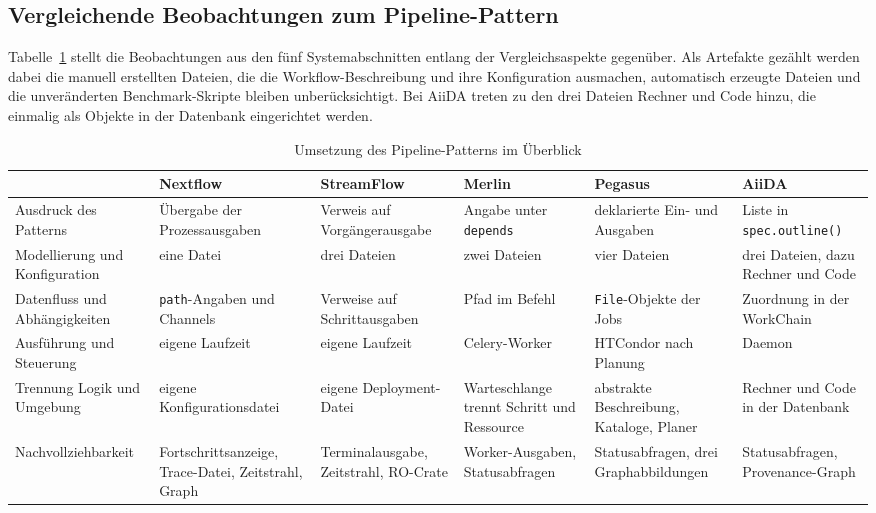 \subsection{Vergleichende Beobachtungen zum Pipeline-Pattern}
\label{sec:lokal:pipeline:zusammenfassung}

Tabelle~\ref{tab:pipe:vergleich} stellt die Beobachtungen aus den
fünf Systemabschnitten entlang der Vergleichsaspekte gegenüber. Als
Artefakte gezählt werden dabei die manuell erstellten Dateien, die
die Workflow-Beschreibung und ihre Konfiguration ausmachen,
automatisch erzeugte Dateien und die unveränderten Benchmark-Skripte
bleiben unberücksichtigt. Bei AiiDA treten zu den drei Dateien
Rechner und Code hinzu, die einmalig als Objekte in der Datenbank
eingerichtet werden.

\begin{table}[H]
  \caption{Umsetzung des Pipeline-Patterns im Überblick}
  \label{tab:pipe:vergleich}
  \centering
  \scriptsize
  \setlength{\tabcolsep}{3pt}
  \renewcommand{\arraystretch}{1.4}
  \begin{tabular}{>{\raggedright\arraybackslash}p{2.7cm} >{\raggedright\arraybackslash}p{1.9cm} >{\raggedright\arraybackslash}p{1.9cm} >{\raggedright\arraybackslash}p{1.9cm} >{\raggedright\arraybackslash}p{1.9cm} >{\raggedright\arraybackslash}p{1.9cm}}
    \hline
     & \textbf{Nextflow} & \textbf{Stream\-Flow} & \textbf{Merlin} & \textbf{Pegasus} & \textbf{AiiDA} \\
    \hline
    Ausdruck des Patterns & Übergabe der Prozess\-ausgaben & Verweis auf Vorgänger\-ausgabe & Angabe unter \texttt{depends} & deklarierte Ein- und Ausgaben & Liste in \texttt{spec.outline()} \\
    Modellierung und Konfiguration & eine Datei & drei Dateien & zwei Dateien & vier Dateien & drei Dateien, dazu Rechner und Code \\
    Datenfluss und Abhängigkeiten & \texttt{path}-Angaben und Channels & Verweise auf Schritt\-ausgaben & Pfad im Befehl & \texttt{File}-Objekte der Jobs & Zuordnung in der WorkChain \\
    Ausführung und Steuerung & eigene Laufzeit & eigene Laufzeit & Celery-Worker & HTCondor nach Planung & Daemon \\
    Trennung Logik und Umgebung & eigene Konfigu\-rationsdatei & eigene Deployment-Datei & Warteschlange trennt Schritt und Ressource & abstrakte Beschreibung, Kataloge, Planer & Rechner und Code in der Datenbank \\
    Nachvollziehbarkeit & Fortschritts\-anzeige, Trace-Datei, Zeitstrahl, Graph & Terminal\-ausgabe, Zeitstrahl, RO-Crate & Worker-Ausgaben, Status\-abfragen & Status\-abfragen, drei Graph\-abbildungen & Status\-abfragen, Provenance-Graph \\
    \hline
  \end{tabular}
\end{table}

